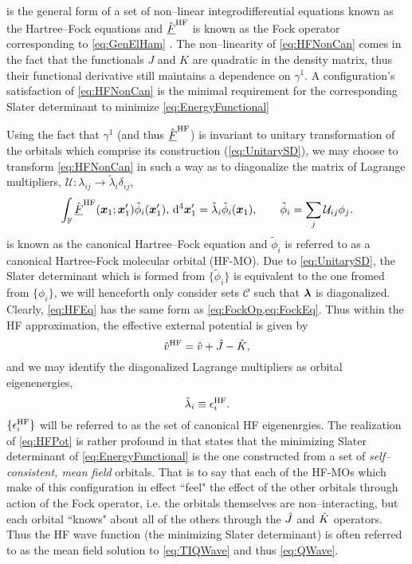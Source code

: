  is the general form of a set of non--linear integrodifferential equations known as the Hartree--Fock equations and $\hat{\underline{F}}^{\mathrm{HF}}$ is
known as the Fock operator corresponding to \cref{eq:GenElHam} . The non--linearity of \cref{eq:HFNonCan} comes in the fact that the functionals
$J$ and $K$ are quadratic in the density matrix, thus their functional derivative still maintains a dependence on $\gamma^1$. 
A configuration's satisfaction of \cref{eq:HFNonCan} is the minimal requirement for the corresponding Slater determinant to minimize \cref{eq:EnergyFunctional}

Using the fact that $\gamma^1$ (and thus $\hat{\underline{F}}^{\mathrm{HF}}$) is invariant to unitary transformation of the orbitals which comprise its construction (\cref{eq:UnitarySD}),
we may choose to transform \cref{eq:HFNonCan} in such a way as to diagonalize the matrix of Lagrange multipliers, 
$\mathcal U: \lambda_{ij} \rightarrow \tilde\lambda_{i} \delta_{ij}$,
\begin{equation}
\label{eq:HFEq}
\int_{\mathbb F} \hat{\underline{F}}^{\mathrm{HF}}(\boldsymbol{x}_1; \boldsymbol{x}_1') \tilde\phi_i(\boldsymbol{x}_1'), \,\mathrm{d}^4\boldsymbol{x}'_1 = \tilde\lambda_i \tilde\phi_i(\boldsymbol{x}_1), 
  \qquad \tilde\phi_i = \sum_j\mathcal U_{ij}\phi_j. 
\end{equation}
 is known as the canonical Hartree--Fock equation and $\tilde \phi_i$ is referred to as a canonical Hartree-Fock molecular orbital (HF-MO). 
Due to \cref{eq:UnitarySD}, the Slater determinant which is formed from $\{\tilde \phi_i\}$ is equivalent to the one fromed
from $\{\phi_i\}$, we will henceforth only consider sets $\mathcal C$ such that $\boldsymbol{\lambda}$ is diagonalized.
Clearly, \cref{eq:HFEq} has the same form as \cref{eq:FockOp,eq:FockEq}. Thus within the HF approximation, the effective external potential
is given by
\begin{equation}
\label{eq:HFPot}
\hat{v}^\mathrm{HF} = \hat{v} + \hat{J} - \hat{K},
\end{equation}
and we may identify the diagonalized Lagrange multipliers as orbital eigenenergies,
\begin{equation}
\tilde\lambda_i \equiv \epsilon^{\mathrm{HF}}_i.
\end{equation}
$\{ \epsilon^{\mathrm{HF}}_i \}$ will be referred to as the set of canonical HF eigenenrgies.
The realization of \cref{eq:HFPot} is rather profound in that states that the minimizing Slater determinant of \cref{eq:EnergyFunctional}
is the one constructed from a set of \emph{self--consistent, mean field} orbitals. That is to say that each of the HF-MOs which make of
this configuration in effect ``feel" the effect of the other orbitals through action of the Fock operator, i.e. the orbitals themselves 
are non--interacting, but each orbital ``knows" about all of the others through the $\hat{J}$ and $\hat{K}$ operators. Thus the HF wave function
(the minimizing Slater determinant) is often referred to as the mean field solution to \cref{eq:TIQWave} and thus \cref{eq:QWave}.

